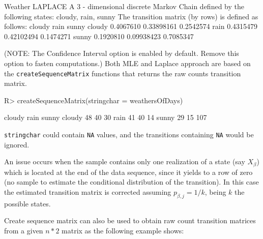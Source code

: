 \documentclass[article,nojss]{jss}
\begin{document}
\begin{CodeChunk}


\begin{CodeOutput}
Weather LAPLACE 
 A  3 - dimensional discrete Markov Chain defined by the following states: 
 cloudy, rain, sunny 
 The transition matrix  (by rows)  is defined as follows: 
          cloudy       rain     sunny
cloudy 0.4067610 0.33898161 0.2542574
rain   0.4315479 0.42102494 0.1474271
sunny  0.1920810 0.09938423 0.7085347
\end{CodeOutput}
\end{CodeChunk}

(NOTE: The Confidence Interval option is enabled by default. Remove this option to fasten computations.) Both MLE and Laplace approach are based on the \texttt{createSequenceMatrix} functions that returns the raw counts transition matrix.

\begin{CodeChunk}

\begin{CodeInput}
R> createSequenceMatrix(stringchar = weathersOfDays)
\end{CodeInput}

\begin{CodeOutput}
       cloudy rain sunny
cloudy     48   40    30
rain       41   40    14
sunny      29   15   107
\end{CodeOutput}
\end{CodeChunk}

\texttt{stringchar} could contain \texttt{NA} values, and the transitions containing \texttt{NA} would be ignored.

An issue occurs when the sample contains only one realization of a state (say \(X_{\beta}\)) which is located at the end of the data sequence, since it yields to a row of zero (no sample to estimate the conditional distribution of the transition). In this case the estimated transition matrix is corrected assuming \(p_{\beta,j}=1/k\), being \(k\) the possible states.

Create sequence matrix can also be used to obtain raw count transition matrices from a given \(n*2\) matrix as the following example shows:
\end{document}
